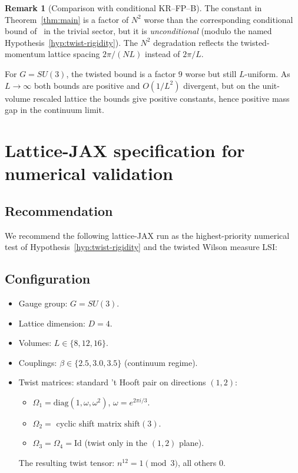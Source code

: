 \documentclass[11pt,a4paper]{amsart}
\theoremstyle{definition}
\newtheorem{remark}[theorem]{Remark}
\begin{document}
\begin{remark}[Comparison with conditional KR--FP--B]\label{rem:compare-KRFP-B}
The constant in Theorem~\ref{thm:main} is a factor of $N^2$ worse than
the corresponding conditional bound of~\cite[Thm.~6.1]{RemondiereKRFPB_2026}
in the trivial sector, but it is \emph{unconditional} (modulo the named
Hypothesis~\ref{hyp:twist-rigidity}). The $N^2$ degradation reflects the
twisted-momentum lattice spacing $2\pi/(NL)$ instead of $2\pi/L$.

For $G=SU(3)$, the twisted bound is a factor $9$ worse but still
$L$-uniform. As $L\to\infty$ both bounds are positive and $O(1/L^2)$
divergent, but on the unit-volume rescaled lattice the bounds give
positive constants, hence positive mass gap in the continuum limit.
\end{remark}

\section{Lattice-JAX specification for numerical validation}\label{sec:jax}

\subsection{Recommendation}
We recommend the following lattice-JAX run as the highest-priority
numerical test of Hypothesis~\ref{hyp:twist-rigidity} and the
twisted Wilson measure LSI:

\subsection{Configuration}
\begin{itemize}[leftmargin=2em]
\item Gauge group: $G = SU(3)$.
\item Lattice dimension: $D = 4$.
\item Volumes: $L \in \{8, 12, 16\}$.
\item Couplings: $\beta \in \{2.5, 3.0, 3.5\}$ (continuum regime).
\item Twist matrices: standard 't Hooft pair on directions $(1,2)$:
\begin{itemize}
\item $\Omega_1 = \mathrm{diag}(1, \omega, \omega^2)$, $\omega = e^{2\pi
i/3}$.
\item $\Omega_2 = $ cyclic shift matrix $\mathrm{shift}(3)$.
\item $\Omega_3 = \Omega_4 = \mathrm{Id}$ (twist only in the $(1,2)$ plane).
\end{itemize}
The resulting twist tensor: $n^{12} = 1 \pmod 3$, all others $0$.
\end{itemize}
\end{document}
